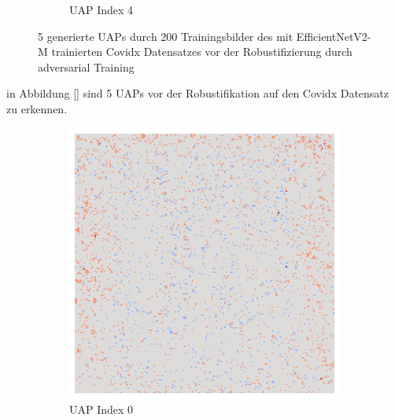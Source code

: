 \begin{figure}[ht!]
\begin{subfigure}{0.19\linewidth}
        \caption{UAP Index 4}
    \end{subfigure}
    \caption{5 generierte UAPs durch 200 Trainingsbilder des mit EfficientNetV2-M trainierten Covidx Datensatzes vor der Robustifizierung durch adversarial Training}
    \label{fig:uap-resnet18-covidx-rob0}
\end{figure}

in Abbildung \ref{} sind 5 UAPs vor der Robustifikation auf den Covidx Datensatz zu erkennen. 

\begin{figure}[ht!]
    \centering
    \begin{subfigure}{0.19\linewidth}
        \centering
        \includegraphics[height=1\linewidth]{01-images/05-resultate/uap_resnet/uap0-resnet18-mri-n200-robustificationslevel0.png}
        \caption{UAP Index 0}
    \end{subfigure}\hfill%
    \begin{subfigure}{0.19\linewidth}
        \centering

\end{subfigure}
\end{figure}
